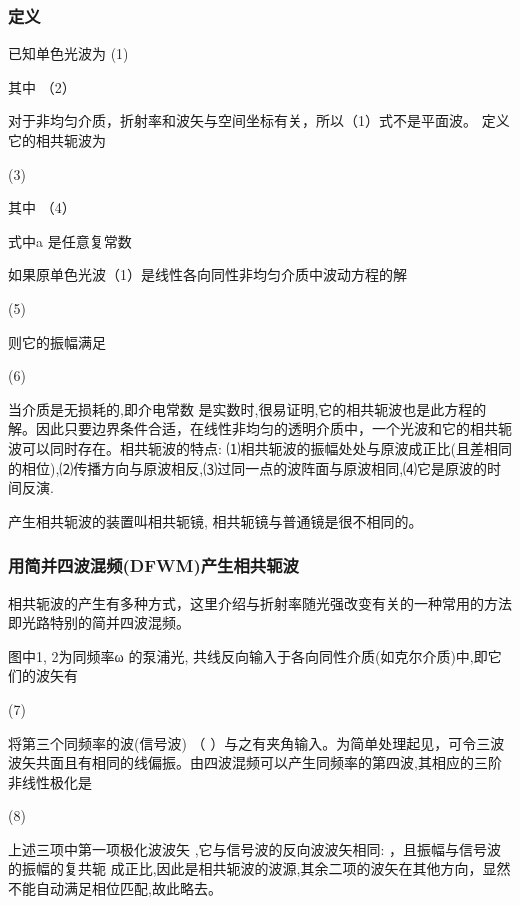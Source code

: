 \subsubsection{定义}

已知单色光波为
                                            (1)

其中                   （2）        

对于非均匀介质，折射率和波矢与空间坐标有关，所以（1）式不是平面波。
定义它的相共轭波为

                                       (3)

      其中                                （4）

式中a 是任意复常数

如果原单色光波（1）是线性各向同性非均匀介质中波动方程的解

                                     (5)

则它的振幅满足

                             (6)

当介质是无损耗的,即介电常数 是实数时,很易证明,它的相共轭波也是此方程的解。因此只要边界条件合适，在线性非均匀的透明介质中，一个光波和它的相共轭波可以同时存在。相共轭波的特点: ⑴相共轭波的振幅处处与原波成正比(且差相同的相位),⑵传播方向与原波相反,⑶过同一点的波阵面与原波相同,⑷它是原波的时间反演.

产生相共轭波的装置叫相共轭镜, 相共轭镜与普通镜是很不相同的。

\subsubsection{用简并四波混频(DFWM)产生相共轭波}

相共轭波的产生有多种方式，这里介绍与折射率随光强改变有关的一种常用的方法即光路特别的简并四波混频。
                                     
图中1, 2为同频率ω 的泵浦光, 共线反向输入于各向同性介质(如克尔介质)中,即它们的波矢有

                                                        (7)

将第三个同频率的波(信号波) （ ）与之有夹角输入。为简单处理起见，可令三波波矢共面且有相同的线偏振。由四波混频可以产生同频率的第四波,其相应的三阶非线性极化是

                    (8)

上述三项中第一项极化波波矢 ,它与信号波的反向波波矢相同: ，且振幅与信号波的振幅的复共轭 成正比,因此是相共轭波的波源,其余二项的波矢在其他方向，显然不能自动满足相位匹配,故此略去。

